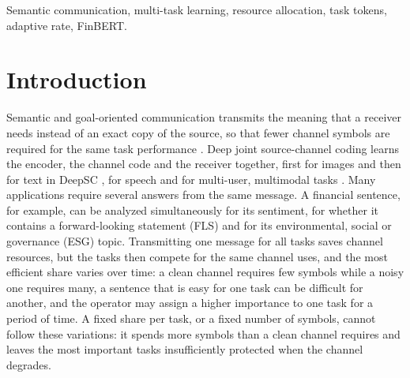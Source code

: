 \documentclass[conference]{IEEEtran}
\begin{document}
\begin{IEEEkeywords}
Semantic communication, multi-task learning, resource allocation,
task tokens, adaptive rate, FinBERT.
\end{IEEEkeywords}

\section{Introduction}
\label{sec:intro}

Semantic and goal-oriented communication transmits the meaning that a
receiver needs instead of an exact copy of the source, so that fewer
channel symbols are required for the same task performance
\cite{gunduz2023beyond, strinati2021beyond}. Deep joint source-channel
coding learns the encoder, the channel code and the receiver together,
first for images \cite{bourtsoulatze2019deep} and then for text in
DeepSC \cite{xie2021deepsc}, for speech \cite{weng2021speech} and for
multi-user, multimodal tasks \cite{xie2022multiuser}. Many applications
require several answers from the same message. A financial sentence,
for example, can be analyzed simultaneously for its sentiment, for
whether it contains a forward-looking statement (FLS) and for its
environmental, social or governance (ESG) topic. Transmitting one
message for all tasks saves channel resources, but the tasks then
compete for the same channel uses, and the most efficient share varies
over time: a clean channel requires few symbols while a noisy one
requires many, a sentence that is easy for one task can be difficult
for another, and the operator may assign a higher importance to one
task for a period of time. A fixed share per task, or a fixed number of
symbols, cannot follow these variations: it spends more symbols than a
clean channel requires and leaves the most important tasks
insufficiently protected when the channel degrades.
\end{document}
